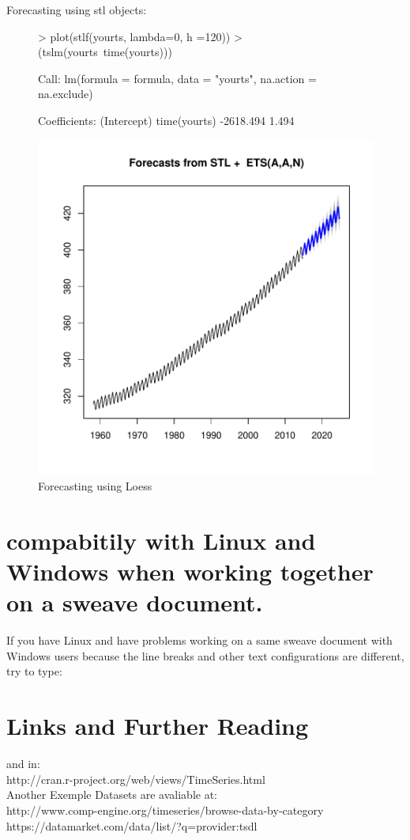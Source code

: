\documentclass[11pt, a4paper]{article} %
\begin{document}
Forecasting using stl objects:
\begin{figure}[H]
\centering
\begin{Schunk}
\begin{Sinput}
> plot(stlf(yourts, lambda=0, h =120))
> (tslm(yourts~time(yourts)))
\end{Sinput}
\begin{Soutput}
Call:
lm(formula = formula, data = "yourts", na.action = na.exclude)

Coefficients:
 (Intercept)  time(yourts)  
   -2618.494         1.494  
\end{Soutput}
\end{Schunk}
\includegraphics{alleselena-070}
\caption{Forecasting using Loess}
\end{figure}




\section{compabitily with Linux and Windows when working together on a sweave document.}
If you have Linux and have problems working on a same sweave document with Windows users because the line breaks and other text configurations are different, try to type:


\section{Links and Further Reading}%
and in:\\
http://cran.r-project.org/web/views/TimeSeries.html\\
Another Exemple Datasets are avaliable at:\\
http://www.comp-engine.org/timeseries/browse-data-by-category\\
https://datamarket.com/data/list/?q=provider:tsdl\\
\end{document}
